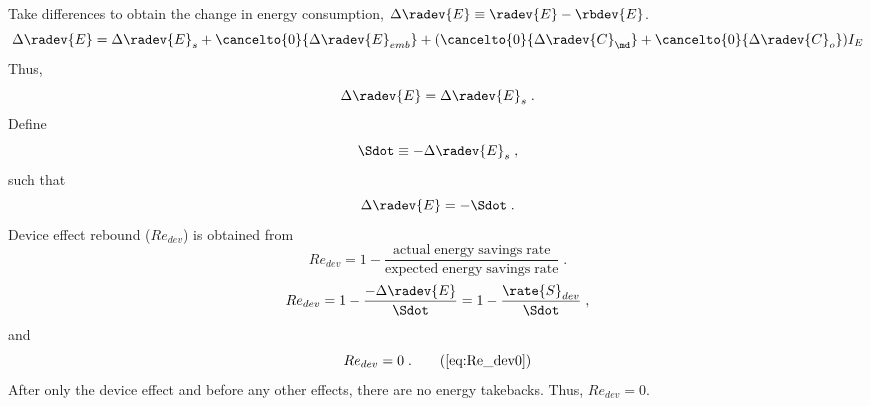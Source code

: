 \begin{landscape}
{Take differences to obtain the change in energy consumption, $\Delta \radev{E} \equiv \radev{E} - \rbdev{E}$.
%
\begin{equation}
  \Delta \radev{E} = \Delta \radev{E}_s
                     + \cancelto{0}{\Delta \radev{E}_{emb}} 
                     + (\cancelto{0}{\Delta \radev{C}_{\md}} 
                     + \cancelto{0}{\Delta \radev{C}_o}) I_E
\end{equation}
%
Thus, 
%
\begin{equation}
\Delta \radev{E} = \Delta \radev{E}_s \; .
\end{equation}
%
Define
%
\begin{equation}
\Sdot \equiv -\Delta \radev{E}_s \; ,
\end{equation}
%
such that
%
\begin{equation}
\Delta \radev{E} = -\Sdot \; .
\end{equation}
%
Device effect rebound ($Re_{dev}$) is obtained from 
%
\begin{equation}
Re_{dev} = 1 - \frac{\mathrm{actual \; energy \; savings \; rate}}{\mathrm{expected \; energy \; savings \; rate}} \; .
\end{equation}
%
\begin{equation}
Re_{dev} = 1 - \frac{-\Delta \radev{E}}{\Sdot} = 1 - \frac{\rate{S}_{dev}}{\Sdot} \; ,
\end{equation}
%
and
%
\begin{equation}
Re_{dev} = 0 \; . \tag{\ref{eq:Re_dev0}}
\end{equation}
%
After only the device effect and before any other effects, 
there are no energy takebacks. 
Thus, $Re_{dev} = 0$.
%
}
{
~
    
}
\end{landscape}
